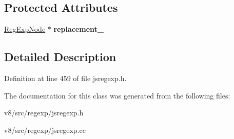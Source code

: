 \subsection*{Protected Attributes}
\begin{DoxyCompactItemize}
\item 
\mbox{\label{classv8_1_1internal_1_1RegExpNode_aac19aaa0fa38bce51ee5b9977c9cf2c5}} 
\mbox{\hyperlink{classv8_1_1internal_1_1RegExpNode}{Reg\+Exp\+Node}} $\ast$ {\bfseries replacement\+\_\+}
\end{DoxyCompactItemize}


\subsection{Detailed Description}


Definition at line 459 of file jsregexp.\+h.



The documentation for this class was generated from the following files\+:\begin{DoxyCompactItemize}
\item 
v8/src/regexp/jsregexp.\+h\item 
v8/src/regexp/jsregexp.\+cc\end{DoxyCompactItemize}
